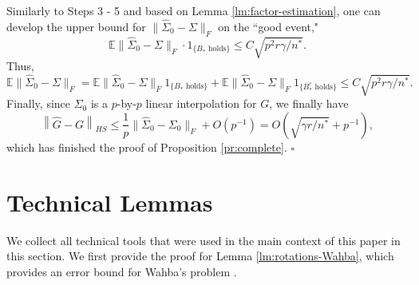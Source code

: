 \documentclass[11pt]{article}
\newcommand{\0}{{\mathbf{0}}}
\newcommand{\1}{{\mathbf{1}}}
\begin{document}
Similarly to Steps 3 - 5 and based on Lemma \ref{lm:factor-estimation}, one can develop the upper bound for $\|\hat{\Sigma}_0 - \Sigma\|_F$ on the ``good event,"
\begin{equation*}
\mathbb{E}\|\hat{\Sigma}_0 - \Sigma\|_F \cdot 1_{\{B_\ast \text{ holds}\}}\leq C\sqrt{p^2r\gamma/n^\ast}.
\end{equation*}
Thus,
\begin{equation*}
\mathbb{E}\|\hat{\Sigma}_0 - \Sigma\|_F = \mathbb{E}\|\hat{\Sigma}_0 - \Sigma\|_F1_{\{B_\ast \text{ holds}\}} + \mathbb{E}\|\hat{\Sigma}_0 - \Sigma\|_F1_{\{B_\ast^c \text{ holds}\}} \leq C\sqrt{p^2r\gamma/n^\ast}.
\end{equation*}
Finally, since $\Sigma_0$ is a $p$-by-$p$ linear interpolation for $G$, we finally have
\begin{equation*}
\left\|\hat{G} - G\right\|_{HS} \leq \frac{1}{p} \|\hat{\Sigma}_0 - \Sigma_0\|_F + O(p^{-1}) = O(\sqrt{\gamma r/n^\ast}+p^{-1}),
\end{equation*}
which has finished the proof of Proposition \ref{pr:complete}. \quad $\square$






\section{Technical Lemmas}

We collect all technical tools that were used in the main context of this paper in this section. We first provide the proof for Lemma \ref{lm:rotations-Wahba}, which provides an error bound for Wahba's problem \citep{wahba1965least}. 
\end{document}

